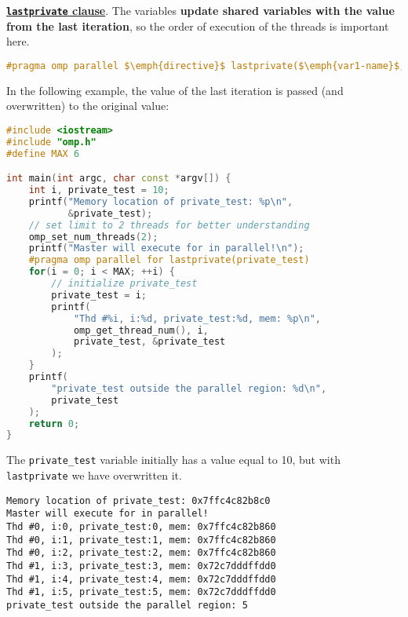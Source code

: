 \highspace
\textbf{\underline{\texttt{lastprivate} clause}}. The variables \textbf{update shared variables with the value from the last iteration}, so the order of execution of the threads is important here.
\begin{openmpbox}
    \begin{lstlisting}[language=C++, mathescape=true]
#pragma omp parallel $\emph{directive}$ lastprivate($\emph{var1-name}$, ...)\end{lstlisting}
\end{openmpbox}
\begin{examplebox}
    In the following example, the value of the last iteration is passed (and overwritten) to the original value:
    \begin{lstlisting}[language=C++]
#include <iostream>
#include "omp.h"
#define MAX 6

int main(int argc, char const *argv[]) {
    int i, private_test = 10;
    printf("Memory location of private_test: %p\n", 
           &private_test);
    // set limit to 2 threads for better understanding
    omp_set_num_threads(2);
    printf("Master will execute for in parallel!\n");
    #pragma omp parallel for lastprivate(private_test)
    for(i = 0; i < MAX; ++i) {
        // initialize private_test
        private_test = i;
        printf(
            "Thd #%i, i:%d, private_test:%d, mem: %p\n", 
            omp_get_thread_num(), i,
            private_test, &private_test
        );
    }
    printf(
        "private_test outside the parallel region: %d\n", 
        private_test
    );
    return 0;
}\end{lstlisting}
    The \texttt{private\_test} variable initially has a value equal to 10, but with \texttt{lastprivate} we have overwritten it.
    \begin{lstlisting}
Memory location of private_test: 0x7ffc4c82b8c0
Master will execute for in parallel!
Thd #0, i:0, private_test:0, mem: 0x7ffc4c82b860
Thd #0, i:1, private_test:1, mem: 0x7ffc4c82b860
Thd #0, i:2, private_test:2, mem: 0x7ffc4c82b860
Thd #1, i:3, private_test:3, mem: 0x72c7dddffdd0
Thd #1, i:4, private_test:4, mem: 0x72c7dddffdd0
Thd #1, i:5, private_test:5, mem: 0x72c7dddffdd0
private_test outside the parallel region: 5\end{lstlisting}
\end{examplebox}

\newpage

